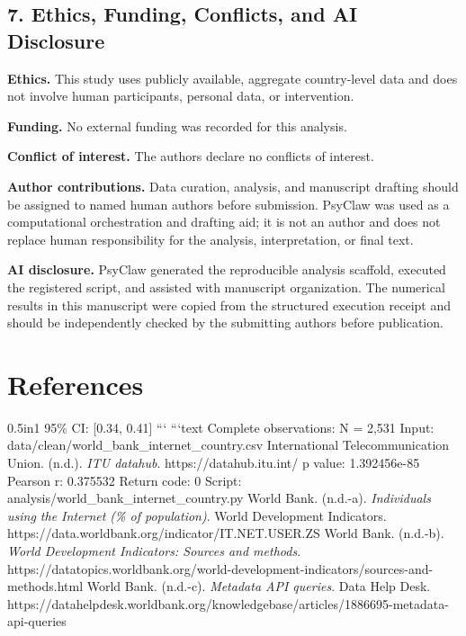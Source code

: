 \documentclass[12pt]{article}
\begin{document}
\subsection{7. Ethics, Funding, Conflicts, and AI Disclosure}
\textbf{Ethics.} This study uses publicly available, aggregate country-level data and does not involve human participants, personal data, or intervention.

\textbf{Funding.} No external funding was recorded for this analysis.

\textbf{Conflict of interest.} The authors declare no conflicts of interest.

\textbf{Author contributions.} Data curation, analysis, and manuscript drafting should be assigned to named human authors before submission. PsyClaw was used as a computational orchestration and drafting aid; it is not an author and does not replace human responsibility for the analysis, interpretation, or final text.

\textbf{AI disclosure.} PsyClaw generated the reproducible analysis scaffold, executed the registered script, and assisted with manuscript organization. The numerical results in this manuscript were copied from the structured execution receipt and should be independently checked by the submitting authors before publication.

\clearpage
\section*{References}
\begin{hangparas}{0.5in}{1}
95\% CI: [0.34, 0.41]
```
```text
Complete observations: N = 2,531
Input: data/clean/world\_bank\_internet\_country.csv
International Telecommunication Union. (n.d.). \textit{ITU datahub}. https://datahub.itu.int/
p value: 1.392456e-85
Pearson r: 0.375532
Return code: 0
Script: analysis/world\_bank\_internet\_country.py
World Bank. (n.d.-a). \textit{Individuals using the Internet (\% of population)}. World Development Indicators. https://data.worldbank.org/indicator/IT.NET.USER.ZS
World Bank. (n.d.-b). \textit{World Development Indicators: Sources and methods}. https://datatopics.worldbank.org/world-development-indicators/sources-and-methods.html
World Bank. (n.d.-c). \textit{Metadata API queries}. Data Help Desk. https://datahelpdesk.worldbank.org/knowledgebase/articles/1886695-metadata-api-queries
\end{hangparas}
\end{document}
